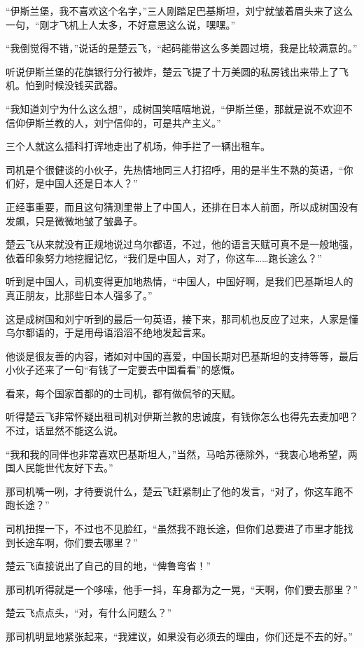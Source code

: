 “伊斯兰堡，我不喜欢这个名字，”三人刚踏足巴基斯坦，刘宁就皱着眉头来了这么一句，“刚才飞机上人太多，不好意思这么说，嘿嘿。”

“我倒觉得不错，”说话的是楚云飞，“起码能带这么多美圆过境，我是比较满意的。”

听说伊斯兰堡的花旗银行分行被炸，楚云飞提了十万美圆的私房钱出来带上了飞机。怕到时候没钱买武器。

“我知道刘宁为什么这么想”，成树国笑嘻嘻地说，“伊斯兰堡，那就是说不欢迎不信仰伊斯兰教的人，刘宁信仰的，可是共产主义。”

三个人就这么插科打诨地走出了机场，伸手拦了一辆出租车。

司机是个很健谈的小伙子，先热情地同三人打招呼，用的是半生不熟的英语，“你们好，是中国人还是日本人？”

正经事重要，而且这句猜测里带上了中国人，还排在日本人前面，所以成树国没有发飙，只是微微地皱了皱鼻子。

楚云飞从来就没有正规地说过乌尔都语，不过，他的语言天赋可真不是一般地强，依着印象努力地挖掘记忆，“我们是中国人，对了，你这车……跑长途么？”

听到是中国人，司机变得更加地热情，“中国人，中国好啊，是我们巴基斯坦人的真正朋友，比那些日本人强多了。”

这是成树国和刘宁听到的最后一句英语，接下来，那司机也反应了过来，人家是懂乌尔都语的，于是用母语滔滔不绝地发起言来。

他谈是很友善的内容，诸如对中国的喜爱，中国长期对巴基斯坦的支持等等，最后小伙子还来了一句“有钱了一定要去中国看看”的感慨。

看来，每个国家首都的的士司机，都有做侃爷的天赋。

听得楚云飞非常怀疑出租司机对伊斯兰教的忠诚度，有钱你怎么也得先去麦加吧？不过，话显然不能这么说。

“我和我的同伴也非常喜欢巴基斯坦人，”当然，马哈苏德除外，“我衷心地希望，两国人民能世代友好下去。”

那司机嘴一咧，才待要说什么，楚云飞赶紧制止了他的发言，“对了，你这车跑不跑长途？”

司机扭捏一下，不过也不见脸红，“虽然我不跑长途，但你们总要进了市里才能找到长途车啊，你们要去哪里？”

楚云飞直接说出了自己的目的地，“俾鲁弯省！”

那司机听得就是一个哆嗦，他手一抖，车身都为之一晃，“天啊，你们要去那里？”

楚云飞点点头，“对，有什么问题么？”

那司机明显地紧张起来，“我建议，如果没有必须去的理由，你们还是不去的好。”


